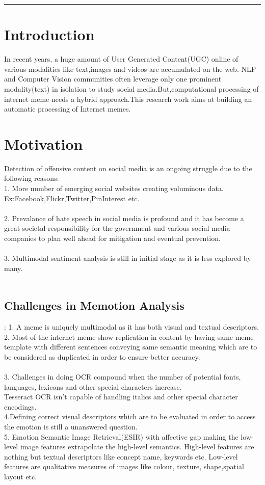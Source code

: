 \documentclass[12pt,a4paper]{article}
\begin{document}
\reviewtitle
\hrule

\section{Introduction}
In recent years, a huge amount of User Generated Content(UGC) online of various modalities like text,images and videos are accumulated on the web. NLP and Computer Vision communities often leverage only one prominent modality(text) in isolation to study social media.But,computational processing of internet meme needs a hybrid approach.This research work aims at building an automatic processing of Internet memes.

\section{Motivation}
Detection of offensive content on social media is an ongoing struggle due to the following reasons:\\
1. More number of emerging social websites creating voluminous data.\\Ex:Facebook,Flickr,Twitter,PinInterest etc. \\~\\
2. Prevalance of hate speech in social media is profound and it has become a great societal responsibility for the government and various social media companies to plan well ahead for mitigation and eventual prevention.\\~\\
3. Multimodal sentiment analysis is still in initial stage as it is less explored by many.\\~\\
\newpage
\subsection{Challenges in Memotion Analysis}:
1. A meme is uniquely multimodal as it has both visual and textual descriptors.\\
2. Most of the internet meme show replication in content by having same meme template with different sentences conveying same semantic meaning which are to be considered as duplicated in order to ensure better accuracy.\\~\\
3. Challenges in doing OCR compound when the number of potential fonts, languages, lexicons and other special characters increase.\\
Tesseract OCR isn't capable of handling italics and other special character encodings.\\
4.Defining correct visual descriptors which are to be evaluated in order to access the emotion is still a unanswered question.\\
5. Emotion Semantic Image Retrieval(ESIR) with affective gap
making the low-level image features extrapolate the high-level
semantics.
High-level features are nothing but textual descriptors like concept name, keywords etc.
Low-level features are qualitative measures of images like colour, texture, shape,spatial layout etc.
\end{document}
